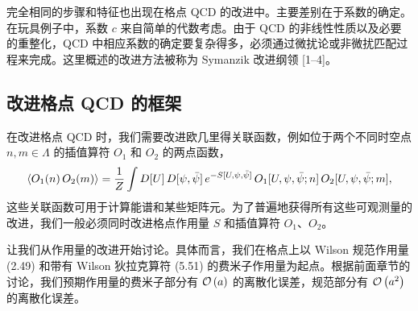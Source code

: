 完全相同的步骤和特征也出现在格点 QCD 的改进中。主要差别在于系数的确定。在玩具例子中，系数 $c$ 来自简单的代数考虑。由于 QCD 的非线性性质以及必要的重整化，QCD 中相应系数的确定要复杂得多，必须通过微扰论或非微扰匹配过程来完成。这里概述的改进方法被称为 Symanzik 改进纲领 [1--4]。

\subsection{改进格点 QCD 的框架}
\label{sec:9.1.2}

在改进格点 QCD 时，我们需要改进欧几里得关联函数，例如位于两个不同时空点 $n, m \in \Lambda$ 的插值算符 $O_1$ 和 $O_2$ 的两点函数，
\begin{equation}
  \left\langle O_1(n)\,O_2(m) \right\rangle
  = \frac{1}{Z}\int D[U]\,D[\psi,\bar\psi]\,
    e^{-S[U,\psi,\bar\psi]}\,O_1[U,\psi,\bar\psi;n]\,O_2[U,\psi,\bar\psi;m] ,
\end{equation}
这些关联函数可用于计算能谱和某些矩阵元。为了普遍地获得所有这些可观测量的改进，我们一般必须同时改进格点作用量 $S$ 和插值算符 $O_1$、$O_2$。

让我们从作用量的改进开始讨论。具体而言，我们在格点上以 Wilson 规范作用量 (2.49) 和带有 Wilson 狄拉克算符 (5.51) 的费米子作用量为起点。根据前面章节的讨论，我们预期作用量的费米子部分有 $\mathcal{O}\left(a\right)$ 的离散化误差，规范部分有 $\mathcal{O}\left(a^2\right)$ 的离散化误差。

